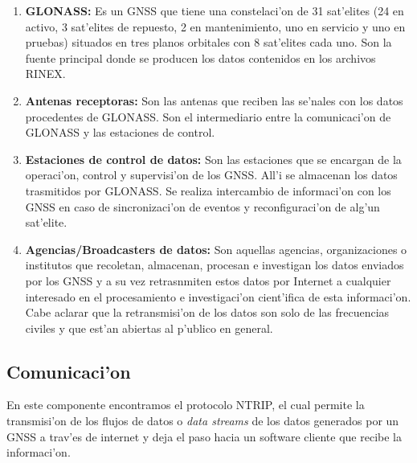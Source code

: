 \begin{enumerate}
\item \textbf{GLONASS:} Es un GNSS que tiene una constelaci'on de 31 sat'elites (24 en activo, 3 sat'elites de repuesto, 2 en mantenimiento, uno en servicio y uno en pruebas) situados en tres planos orbitales con 8 sat'elites cada uno.
Son la fuente principal donde se producen los datos contenidos en los archivos RINEX.
\item \textbf{Antenas receptoras:} Son las antenas que reciben las se'nales con los datos procedentes de GLONASS. Son el intermediario entre la comunicaci'on de GLONASS y las estaciones de control.
\item \textbf{Estaciones de control de datos:} Son las estaciones que se encargan de la operaci'on, control y supervisi'on de los GNSS. All'i se almacenan los datos trasmitidos por GLONASS. Se realiza intercambio de informaci'on con los GNSS en caso de sincronizaci'on de eventos y reconfiguraci'on de alg'un sat'elite.
\item \textbf{Agencias/Broadcasters de datos:} Son aquellas agencias, organizaciones o institutos que recoletan, almacenan, procesan e investigan los datos enviados por los GNSS y a su vez retrasnmiten estos datos por Internet a cualquier interesado en el procesamiento e investigaci'on cient'ifica de esta informaci'on.
Cabe aclarar que la retransmisi'on de los datos son solo de las frecuencias civiles y que est'an abiertas al p'ublico en general.
\end{enumerate}

\subsection{Comunicaci'on}
\noindent
En este componente encontramos el protocolo NTRIP, el cual permite la transmisi'on de los flujos de datos o \emph{data streams} de los datos generados por un GNSS a trav'es de internet y deja el paso hacia un software cliente que recibe la informaci'on.

